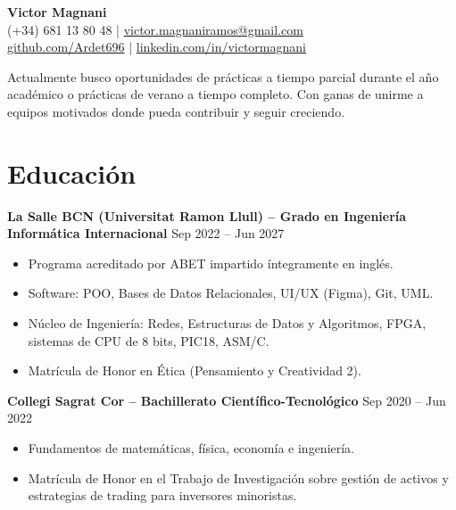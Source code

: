 \documentclass[11pt, a4paper]{article}
\begin{document}
\begin{center}
    {\huge \textbf{Victor Magnani}} \\
    \vspace{4pt}
    (+34) 681 13 80 48 \quad | \quad \href{mailto:victor.magnaniramos@gmail.com}{victor.magnaniramos@gmail.com} \\
    \href{https://github.com/Ardet696}{github.com/Ardet696} \quad | \quad \href{https://linkedin.com/in/victormagnani}{linkedin.com/in/victormagnani}
\end{center}

\vspace{0.3em}
\begin{center}
    {\small Actualmente busco oportunidades de prácticas a tiempo parcial durante el año académico o prácticas de verano a tiempo completo. Con ganas de unirme a equipos motivados donde pueda contribuir y seguir creciendo.}
\end{center}

\section{Educación}

\textbf{La Salle BCN (Universitat Ramon Llull) -- Grado en Ingeniería Informática Internacional} \hfill Sep 2022 -- Jun 2027
\begin{itemize}
    \item Programa acreditado por ABET impartido íntegramente en inglés.
    \item Software: POO, Bases de Datos Relacionales, UI/UX (Figma), Git, UML.
    \item Núcleo de Ingeniería: Redes, Estructuras de Datos y Algoritmos, FPGA, sistemas de CPU de 8 bits, PIC18, ASM/C.
    \item Matrícula de Honor en Ética (Pensamiento y Creatividad 2).
\end{itemize}

\vspace{0.8em}

\textbf{Collegi Sagrat Cor -- Bachillerato Científico-Tecnológico} \hfill Sep 2020 -- Jun 2022
\begin{itemize}
    \item Fundamentos de matemáticas, física, economía e ingeniería.
    \item Matrícula de Honor en el Trabajo de Investigación sobre gestión de activos y estrategias de trading para inversores minoristas.
\end{itemize}
\end{document}
